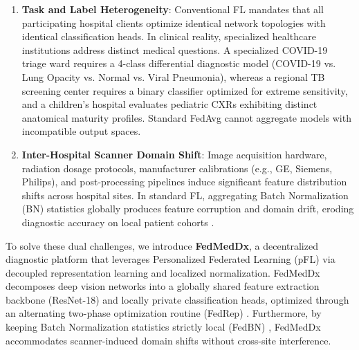 \documentclass[conference]{IEEEtran}
\newcommand{\compactitems}{%
  \setlength{\itemsep}{1.2pt}%
  \setlength{\parskip}{0pt}%
  \setlength{\parsep}{0pt}%
  \setlength{\topsep}{2pt}%
  \setlength{\partopsep}{0pt}%
}
\begin{document}
\begin{enumerate}\compactitems
    \item \textbf{Task and Label Heterogeneity}: Conventional FL mandates that all participating hospital clients optimize identical network topologies with identical classification heads. In clinical reality, specialized healthcare institutions address distinct medical questions. A specialized COVID-19 triage ward requires a 4-class differential diagnostic model (COVID-19 vs. Lung Opacity vs. Normal vs. Viral Pneumonia), whereas a regional TB screening center requires a binary classifier optimized for extreme sensitivity, and a children's hospital evaluates pediatric CXRs exhibiting distinct anatomical maturity profiles. Standard FedAvg cannot aggregate models with incompatible output spaces.
    \item \textbf{Inter-Hospital Scanner Domain Shift}: Image acquisition hardware, radiation dosage protocols, manufacturer calibrations (e.g., GE, Siemens, Philips), and post-processing pipelines induce significant feature distribution shifts across hospital sites. In standard FL, aggregating Batch Normalization (BN) statistics globally produces feature corruption and domain drift, eroding diagnostic accuracy on local patient cohorts \cite{li2021fedbn}.
\end{enumerate}

To solve these dual challenges, we introduce \textbf{FedMedDx}, a decentralized diagnostic platform that leverages Personalized Federated Learning (pFL) via decoupled representation learning and localized normalization. FedMedDx decomposes deep vision networks into a globally shared feature extraction backbone (ResNet-18) and locally private classification heads, optimized through an alternating two-phase optimization routine (FedRep) \cite{collins2021exploiting}. Furthermore, by keeping Batch Normalization statistics strictly local (FedBN) \cite{li2021fedbn}, FedMedDx accommodates scanner-induced domain shifts without cross-site interference. 
\end{document}
